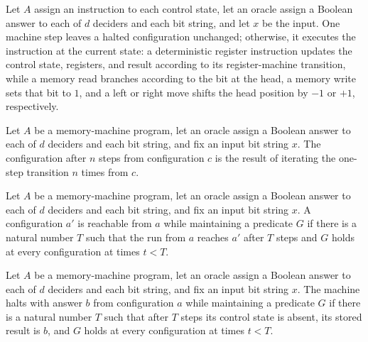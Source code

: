 \begin{definition}
\label{Complexity.LogProg.mstep}
\leanok
{}
Let $A$ assign an instruction to each control state, let an oracle assign a Boolean
answer to each of $d$ deciders and each bit string, and let $x$ be the input. One
machine step leaves a halted configuration unchanged; otherwise, it executes the
instruction at the current state: a deterministic register instruction updates the
control state, registers, and result according to its register-machine transition, while
a memory read branches according to the bit at the head, a memory write sets that bit to
$1$, and a left or right move shifts the head position by $-1$ or $+1$, respectively.
\end{definition}

\begin{definition}
\label{Complexity.LogProg.mrun}
\leanok
{}
Let $A$ be a memory-machine program, let an oracle assign a Boolean answer to each of
$d$ deciders and each bit string, and fix an input bit string $x$. The configuration
after $n$ steps from configuration $c$ is the result of iterating the one-step
transition $n$ times from $c$.
\end{definition}

\begin{definition}
\label{Complexity.LogProg.MReach}
\leanok
{}
Let $A$ be a memory-machine program, let an oracle assign a Boolean answer to each of
$d$ deciders and each bit string, and fix an input bit string $x$. A configuration $a'$
is reachable from $a$ while maintaining a predicate $G$ if there is a natural number $T$
such that the run from $a$ reaches $a'$ after $T$ steps and $G$ holds at every
configuration at times $t<T$.
\end{definition}

\begin{definition}
\label{Complexity.LogProg.MHalt}
\leanok
{}
Let $A$ be a memory-machine program, let an oracle assign a Boolean answer to each of
$d$ deciders and each bit string, and fix an input bit string $x$. The machine halts
with answer $b$ from configuration $a$ while maintaining a predicate $G$ if there is a
natural number $T$ such that after $T$ steps its control state is absent, its stored
result is $b$, and $G$ holds at every configuration at times $t<T$.
\end{definition}

